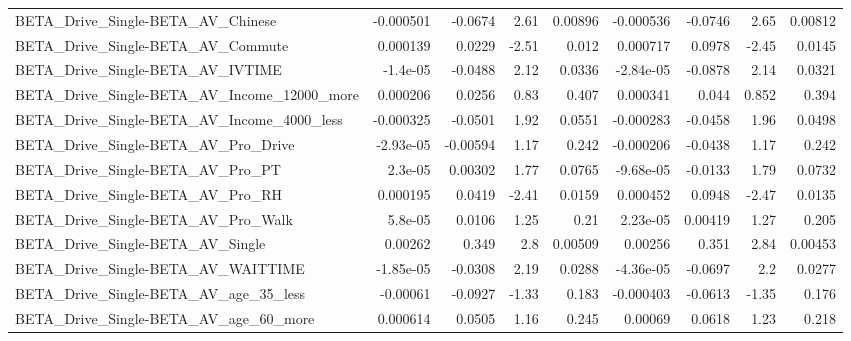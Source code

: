 \begin{tabular}{lrrrrrrrr}
BETA\_Drive\_Single-BETA\_AV\_Chinese                  &   -0.000501 &      -0.0674 &      2.61 &  0.00896 &  -0.000536 &     -0.0746 &         2.65 &       0.00812 \\
BETA\_Drive\_Single-BETA\_AV\_Commute                  &    0.000139 &       0.0229 &     -2.51 &    0.012 &   0.000717 &      0.0978 &        -2.45 &        0.0145 \\
BETA\_Drive\_Single-BETA\_AV\_IVTIME                   &    -1.4e-05 &      -0.0488 &      2.12 &   0.0336 &  -2.84e-05 &     -0.0878 &         2.14 &        0.0321 \\
BETA\_Drive\_Single-BETA\_AV\_Income\_12000\_more        &    0.000206 &       0.0256 &      0.83 &    0.407 &   0.000341 &       0.044 &        0.852 &         0.394 \\
BETA\_Drive\_Single-BETA\_AV\_Income\_4000\_less         &   -0.000325 &      -0.0501 &      1.92 &   0.0551 &  -0.000283 &     -0.0458 &         1.96 &        0.0498 \\
BETA\_Drive\_Single-BETA\_AV\_Pro\_Drive                &   -2.93e-05 &     -0.00594 &      1.17 &    0.242 &  -0.000206 &     -0.0438 &         1.17 &         0.242 \\
BETA\_Drive\_Single-BETA\_AV\_Pro\_PT                   &     2.3e-05 &      0.00302 &      1.77 &   0.0765 &  -9.68e-05 &     -0.0133 &         1.79 &        0.0732 \\
BETA\_Drive\_Single-BETA\_AV\_Pro\_RH                   &    0.000195 &       0.0419 &     -2.41 &   0.0159 &   0.000452 &      0.0948 &        -2.47 &        0.0135 \\
BETA\_Drive\_Single-BETA\_AV\_Pro\_Walk                 &     5.8e-05 &       0.0106 &      1.25 &     0.21 &   2.23e-05 &     0.00419 &         1.27 &         0.205 \\
BETA\_Drive\_Single-BETA\_AV\_Single                   &     0.00262 &        0.349 &       2.8 &  0.00509 &    0.00256 &       0.351 &         2.84 &       0.00453 \\
BETA\_Drive\_Single-BETA\_AV\_WAITTIME                 &   -1.85e-05 &      -0.0308 &      2.19 &   0.0288 &  -4.36e-05 &     -0.0697 &          2.2 &        0.0277 \\
BETA\_Drive\_Single-BETA\_AV\_age\_35\_less              &    -0.00061 &      -0.0927 &     -1.33 &    0.183 &  -0.000403 &     -0.0613 &        -1.35 &         0.176 \\
BETA\_Drive\_Single-BETA\_AV\_age\_60\_more              &    0.000614 &       0.0505 &      1.16 &    0.245 &    0.00069 &      0.0618 &         1.23 &         0.218 \\

\end{tabular}
